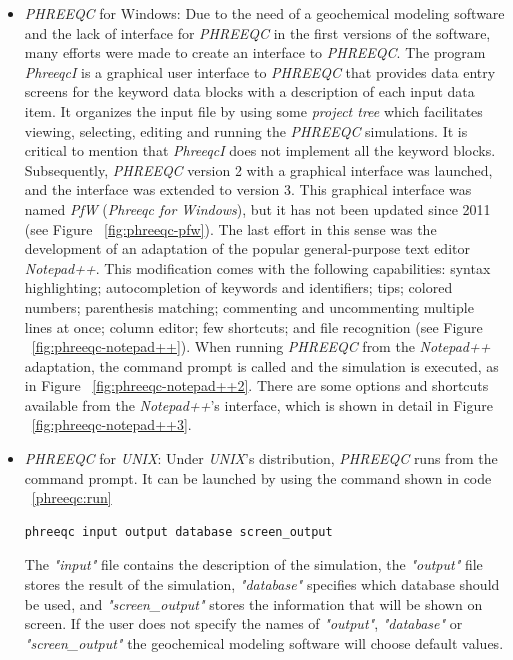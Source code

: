 \begin{itemize}
\item \emph{PHREEQC} for Windows: Due to the need of a geochemical modeling software and the lack of interface for \emph{PHREEQC} in the first versions of the software, many efforts were made to create an interface to \emph{PHREEQC}. The program \emph{PhreeqcI} is a graphical user interface to \emph{PHREEQC} that provides data entry screens for the keyword data blocks with a description of each input data item. It organizes the input file by using some \emph{project tree} which facilitates viewing, selecting, editing and running the \emph{PHREEQC} simulations. It is critical to mention that \emph{PhreeqcI} does not implement all the keyword blocks. Subsequently, \emph{PHREEQC} version 2 with a graphical interface was launched, and the interface was extended to version 3. This graphical interface was named \emph{PfW} (\emph{Phreeqc for Windows}), but it has not been updated since 2011 (see Figure ~\ref{fig:phreeqc-pfw}). The last effort in this sense was the development of an adaptation of the popular general-purpose text editor \emph{Notepad++}. This modification comes with the following capabilities: syntax highlighting; autocompletion of keywords and identifiers; tips; colored numbers; parenthesis matching; commenting and uncommenting multiple lines at once; column editor; few shortcuts; and file recognition (see Figure ~\ref{fig:phreeqc-notepad++}). When running \emph{PHREEQC} from the \emph{Notepad++} adaptation, the command prompt is called and the simulation is executed, as in Figure ~\ref{fig:phreeqc-notepad++2}. There are some options and shortcuts available from the \emph{Notepad++}'s interface, which is shown in detail in Figure ~\ref{fig:phreeqc-notepad++3}.
\item \emph{PHREEQC} for \emph{UNIX}: Under \emph{UNIX}'s distribution, \emph{PHREEQC} runs from the command prompt. It can be launched by using the command shown in code ~\ref{phreeqc:run}
\begin{lstlisting}[frame=single, caption=Command to run UNIX's \emph{PHREEQC}, label=phreeqc:run]
phreeqc input output database screen_output
\end{lstlisting}
The \emph{"input"} file contains the description of the simulation, the \emph{"output"} file stores the result of the simulation, \emph{"database"} specifies which database should be used, and \emph{"screen\_output"} stores the information that will be shown on screen. If the user does not specify the names of \emph{"output"}, \emph{"database"} or \emph{"screen\_output"} the geochemical modeling software will choose default values.
\end{itemize}

